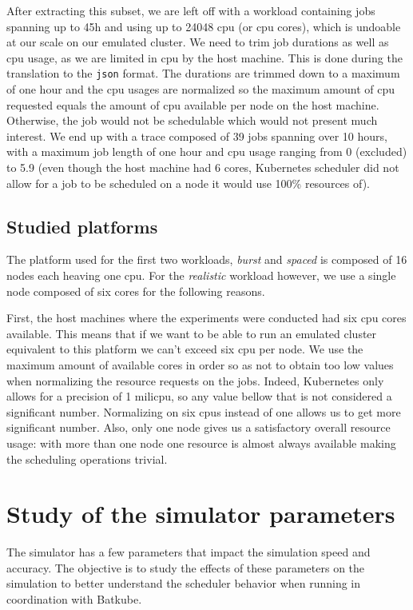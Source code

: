 After extracting this subset, we are left off with a workload containing jobs
spanning up to 45h and using up to 24048 cpu (or cpu cores), which is undoable
at our scale on our emulated cluster. We need to trim job durations as well as
cpu usage, as we are limited in cpu by the host machine. This is done during
the translation to the \texttt{json} format. The durations are trimmed down to
a maximum of one hour and the cpu usages are normalized so the maximum amount
of cpu requested equals the amount of cpu available per node on the host
machine. Otherwise, the job would not be schedulable which would not present
much interest. We end up with a trace composed of 39 jobs spanning over 10
hours, with a maximum job length of one hour and cpu usage ranging from 0
(excluded) to 5.9 (even though the host machine had 6 cores, Kubernetes
scheduler did not allow for a job to be scheduled on a node it would use 100\%
resources of).

\subsection{Studied platforms}

The platform used for the first two workloads, \textit{burst} and
\textit{spaced} is composed of 16 nodes each heaving one cpu. For the
\textit{realistic} workload however, we use a single node composed of six cores
for the following reasons.

First, the host machines where the experiments were conducted had six cpu cores
available. This means that if we want to be able to run an emulated cluster
equivalent to this platform we can't exceed six cpu per node.  We use the
maximum amount of available cores in order so as not to obtain too low values
when normalizing the resource requests on the jobs. Indeed, Kubernetes only
allows for a precision of 1 milicpu, so any value bellow that is not considered
a significant number. Normalizing on six cpus instead of one allows us to get
more significant number. Also, only one node gives us a satisfactory overall
resource usage: with more than one node one resource is almost always available
making the scheduling operations trivial.


\section{Study of the simulator parameters} \label{sec:params-eval}

The simulator has a few parameters that impact the simulation speed and
accuracy. The objective is to study the effects of these parameters on the
simulation to better understand the scheduler behavior when running in
coordination with Batkube.\\

